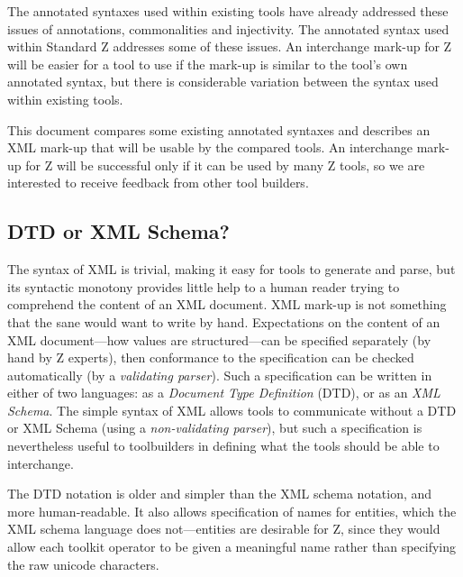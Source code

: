 \documentclass{llncs}  %
\begin{document}
\vspace{1ex}

The annotated syntaxes used within existing tools have already
addressed these issues of annotations, commonalities and injectivity.
The annotated syntax used within Standard Z addresses some of these issues.
An interchange mark-up for Z will be easier for a tool to use
if the mark-up is similar to the tool's own annotated syntax,
but there is considerable variation between the syntax used within existing
tools. 

This document compares some existing annotated syntaxes
and describes an XML mark-up that will be usable by the compared tools.
An interchange mark-up for Z will be successful only if
it can be used by many Z tools, so we are interested to 
receive feedback from other tool builders.


\subsection{DTD or XML Schema?}

The syntax of XML\cite{XML} is trivial,
making it easy for tools to generate and parse,
but its syntactic monotony provides little help to a human reader
trying to comprehend the content of an XML document.
XML mark-up is not something that the sane would want to write by hand.
Expectations on the content of an XML document---how values are
structured---can be specified separately (by hand by Z experts),
then conformance to the specification can be checked automatically
(by a \textit{validating parser}).
Such a specification can be written in either of two languages:
as a \textit{Document Type Definition} (DTD), or as an \textit{XML Schema}.
The simple syntax of XML allows tools to communicate
without a DTD or XML Schema (using a \textit{non-validating parser}),
but such a specification is nevertheless useful to toolbuilders
in defining what the tools should be able to interchange.

The DTD notation is older and simpler than the XML schema notation,
and more human-readable.  It also allows specification of names for
entities, which the XML schema language does not---entities are
desirable for Z, since they would allow each toolkit operator to be
given a meaningful name rather than specifying the raw unicode characters.
\end{document}
